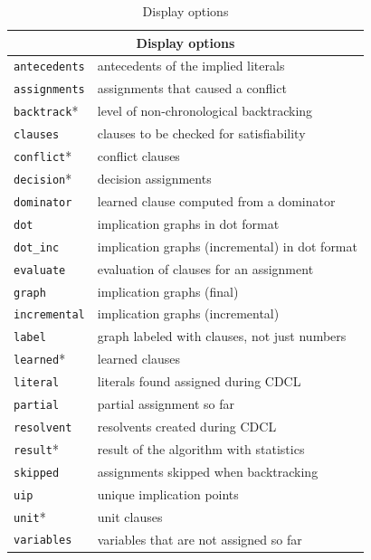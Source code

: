 \documentclass[11pt]{report}
\newcommand*{\p}[1]{\textup{\texttt{#1}}}
\begin{document}
\begin{table}[tbp]
\begin{center}
\begin{tabular}{|l|l|}
\hline
\multicolumn{2}{|c|}{\textbf{\large Display options}}\\
\hline
\p{antecedents}&  antecedents of the implied literals\\
\p{assignments}& assignments that caused a conflict         \\
\p{backtrack}*&  level of non-chronological backtracking    \\
\p{clauses}   &  clauses to be checked for satisfiability   \\
\p{conflict}* &  conflict clauses                           \\
\p{decision}* &  decision assignments                       \\
\p{dominator} &  learned clause computed from a dominator   \\
\p{dot}       &  implication graphs in dot format           \\
\p{dot\_inc}  &  implication graphs (incremental) in dot format\\
\p{evaluate}  &  evaluation of clauses for an assignment    \\
\p{graph}     &  implication graphs (final)                 \\
\p{incremental}& implication graphs (incremental)           \\
\p{label}     &  graph labeled with clauses, not just numbers\\
\p{learned}*  &  learned clauses                            \\
\p{literal}   &  literals found assigned during CDCL        \\
\p{partial}   &  partial assignment so far                  \\
\p{resolvent} &  resolvents created during CDCL             \\
\p{result}*   &  result of the algorithm with statistics    \\
\p{skipped}   &  assignments skipped when backtracking      \\
\p{uip}       &  unique implication points                  \\
\p{unit}*     &  unit clauses                               \\
\p{variables} &  variables that are not assigned so far     \\
\hline
\end{tabular}
\end{center}
\caption{Display options}\label{tab.display}
\end{table}
\end{document}
